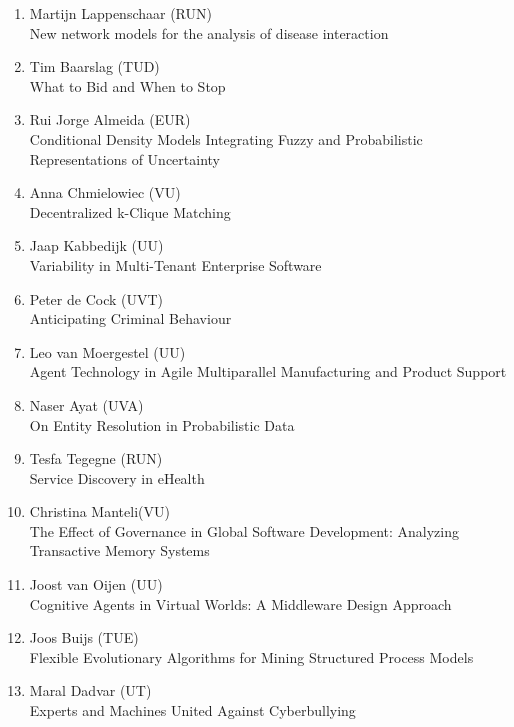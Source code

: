 \begin{multicols}{2}
\begin{scriptsize}
\begin{enumerate}[label=\textbf{2014-\arabic*},leftmargin=0cm,itemindent=1.15cm,labelwidth=\itemindent,labelsep=0cm,align=left,noitemsep]
\item Martijn Lappenschaar (RUN)\\
	New network models for the analysis of disease interaction
	
\item Tim Baarslag (TUD)\\
	What to Bid and When to Stop
	
\item Rui Jorge Almeida (EUR)\\
	Conditional Density Models Integrating Fuzzy and Probabilistic Representations of Uncertainty	

\item Anna Chmielowiec (VU)\\
	Decentralized k-Clique Matching
	
\item Jaap Kabbedijk (UU)\\
	Variability in Multi-Tenant Enterprise Software
	
\item Peter de Cock (UVT)\\
	Anticipating Criminal Behaviour

\item Leo van Moergestel (UU)\\
	Agent Technology in Agile Multiparallel Manufacturing and Product Support 
	
\item Naser Ayat (UVA)\\
	On Entity Resolution in Probabilistic Data
	
\item Tesfa Tegegne (RUN)\\
	Service Discovery in eHealth

\item Christina Manteli(VU)\\
	The Effect of Governance in Global Software Development: Analyzing Transactive Memory Systems

\item Joost van Oijen (UU)\\
	Cognitive Agents in Virtual Worlds: A Middleware Design Approach
	
\item Joos Buijs (TUE)\\
	Flexible Evolutionary Algorithms for Mining Structured Process Models

\item Maral Dadvar (UT)\\
	Experts and Machines United Against Cyberbullying


\end{enumerate}
\end{scriptsize}
\end{multicols}
